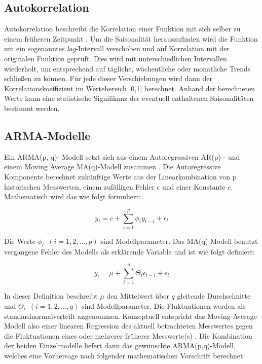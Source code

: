 \documentclass[
ngerman          %
,a4paper          %
,11pt
,pdftex
]{report}
\begin{document}
\subsection{Autokorrelation} \label{autokorr}
Autokorrelation beschreibt die Korrelation einer Funktion mit sich selber zu einem früheren Zeitpunkt \cite[155]{thinkstats}. Um die Saisonalität herauszufinden wird die Funktion um ein sogenanntes \textit{lag}-Intervall verschoben und auf Korrelation mit der originalen Funktion geprüft. Dies wird mit unterschiedlichen Intervallen wiederholt, um entsprechend auf tägliche, wöchentliche oder monatliche Trends schließen zu können. Für jede dieser Verschiebungen wird dann der Korrelationskoeffizient im Wertebereich [0,1] berechnet. Anhand der berechneten Werte kann eine statistische Signifikanz der eventuell enthaltenen Saisonalitäten bestimmt werden.

\subsection{\acf{ARMA}-Modelle}
Ein \ac{ARMA}(p, q)- Modell setzt sich aus einem Autoregressiven AR(p) - und einem Moving Average MA(q)-Modell zusammen \cite[18]{timeseries}. Die Autoregressive Komponente berechnet zukünftige Werte aus der Linearkombination von p historischen Messwerten, einem zufälligen Fehler $\epsilon$ und einer Konstante $c$. Mathematisch wird das wie folgt formuliert:

\begin{equation}
	y_t = c + \sum_{i=1}^{p}\phi_i y_{t-i} + \epsilon_t
\end{equation}

Die Werte $\phi_i$\ $(i = 1, 2, ..., p)$ sind Modellparameter. Das MA(q)-Modell benutzt vergangene Fehler des Modells als erklärende Variable \cite[19]{timeseries} und ist wie folgt definiert:

\begin{equation}
	y_t = \mu + \sum_{i=1}^{q} \Theta_i \epsilon_{t-i} + \epsilon_t
\end{equation}

In dieser Definition beschreibt $\mu$ den Mittelwert über $q$ gleitende Durchschnitte und $\Theta_i$\ $(i=1, 2, ..., q)$ sind Modellparameter. Die Fluktuationen werden als standardnormalverteilt angenommen. Konzeptuell entspricht das Moving-Average Modell also einer linearen Regression des aktuell betrachteten Messwertes gegen die Fluktuationen eines oder mehrerer früherer Messwerte(s) \cite[19]{timeseries}. Die Kombination der beiden Einzelmodelle liefert dann das gewünschte \ac{ARMA}(p,q)-Modell, welches eine Vorhersage nach folgender mathematischen Vorschrift berechnet:
\end{document}
